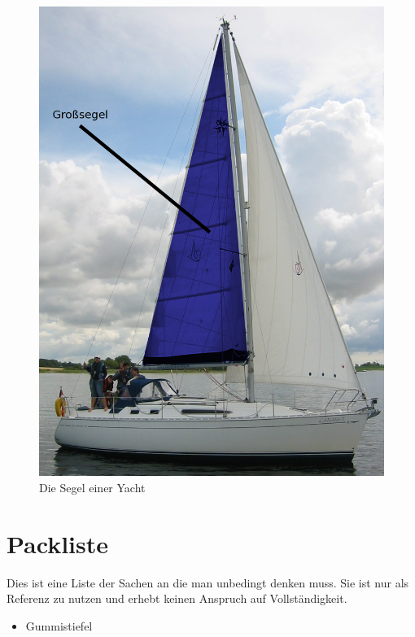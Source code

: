 \documentclass[12pt]{article}
\begin{document}
\begin{figure}[h!]
\begin{center}
\includegraphics[scale=0.3]{bilder/yacht.png}
\end{center}
\caption{Die Segel einer Yacht}
\end{figure}

\section{Packliste}
Dies ist eine Liste der Sachen an die man unbedingt denken muss. Sie ist nur als Referenz zu nutzen und erhebt keinen Anspruch auf Vollständigkeit.

\begin{itemize}
\renewcommand{\labelitemi}{$\boxempty$}
\item Gummistiefel
\end{itemize}
\end{document}
